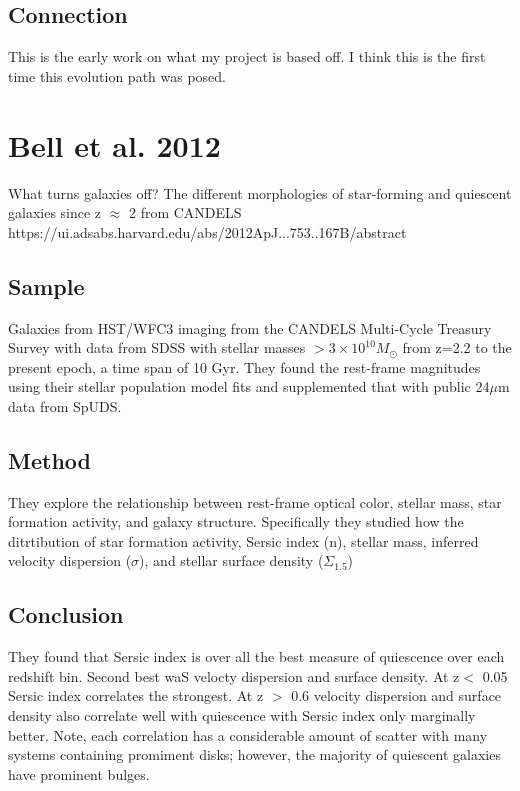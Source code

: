 \documentclass{article}
\begin{document}
\subsection{Connection}
This is the early work on what my project is based off. I think this is the first time this evolution path was posed.


\section{Bell et al. 2012}

What turns galaxies off? The different morphologies of star-forming and quiescent galaxies since z $\approx$ 2 from CANDELS \\
https://ui.adsabs.harvard.edu/abs/2012ApJ...753..167B/abstract \\

\subsection{Sample}
Galaxies from HST/WFC3 imaging from the CANDELS Multi-Cycle Treasury Survey with data from SDSS with stellar masses $> 3 \times 10^{10} M_{\odot}$ from z=2.2 to the present epoch, a time span of 10 Gyr.
They found the rest-frame magnitudes using their stellar population model fits and supplemented that with public 24$\mu$m data from SpUDS.

\subsection{Method}
They explore the relationship between rest-frame optical color, stellar mass, star formation activity, and galaxy structure. Specifically they studied how the ditrtibution of star formation activity, Sersic index (n), stellar mass, inferred velocity dispersion ($\sigma$), and stellar surface density ($\Sigma_{1.5}$)

\subsection{Conclusion}
They found that Sersic index is over all the best measure of quiescence over each redshift bin. Second best waS velocty dispersion and surface density. At z$<$ 0.05 Sersic index correlates the strongest. At z $>$ 0.6 velocity dispersion and surface density also correlate well with quiescence with Sersic index only marginally better. Note, each correlation has a considerable amount of scatter with many systems containing promiment disks; however, the majority of quiescent galaxies have prominent bulges.
\end{document}
